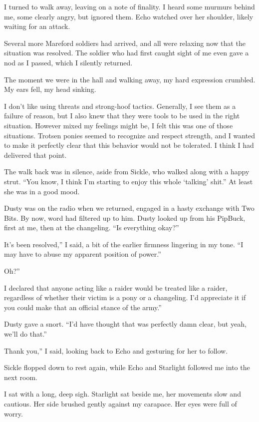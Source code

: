 I turned to walk away, leaving on a note of finality. I heard some murmurs behind me, some clearly angry, but ignored them. Echo watched over her shoulder, likely waiting for an attack.

Several more Mareford soldiers had arrived, and all were relaxing now that the situation was resolved. The soldier who had first caught sight of me even gave a nod as I passed, which I silently returned.

The moment we were in the hall and walking away, my hard expression crumbled. My ears fell, my head sinking.

I don’t like using threats and strong-hoof tactics. Generally, I see them as a failure of reason, but I also knew that they were tools to be used in the right situation. However mixed my feelings might be, I felt this was one of those situations. Trotsen ponies seemed to recognize and respect strength, and I wanted to make it perfectly clear that this behavior would not be tolerated. I think I had delivered that point.

The walk back was in silence, aside from Sickle, who walked along with a happy strut. “You know, I think I’m starting to enjoy this whole ‘talking’ shit.” At least she was in a good mood.

Dusty was on the radio when we returned, engaged in a hasty exchange with Two Bits. By now, word had filtered up to him. Dusty looked up from his PipBuck, first at me, then at the changeling. “Is everything okay?”

\leavevmode{}It’s been resolved,” I said, a bit of the earlier firmness lingering in my tone. “I may have to abuse my apparent position of power.”

\leavevmode{}Oh?”

\leavevmode{}I declared that anyone acting like a raider would be treated like a raider, regardless of whether their victim is a pony or a changeling. I’d appreciate it if you could make that an official stance of the army.”

Dusty gave a snort. “I’d have thought that was perfectly damn clear, but yeah, we’ll do that.”

\leavevmode{}Thank you,” I said, looking back to Echo and gesturing for her to follow.

Sickle flopped down to rest again, while Echo and Starlight followed me into the next room.

I sat with a long, deep sigh. Starlight sat beside me, her movements slow and cautious. Her side brushed gently against my carapace. Her eyes were full of worry.

